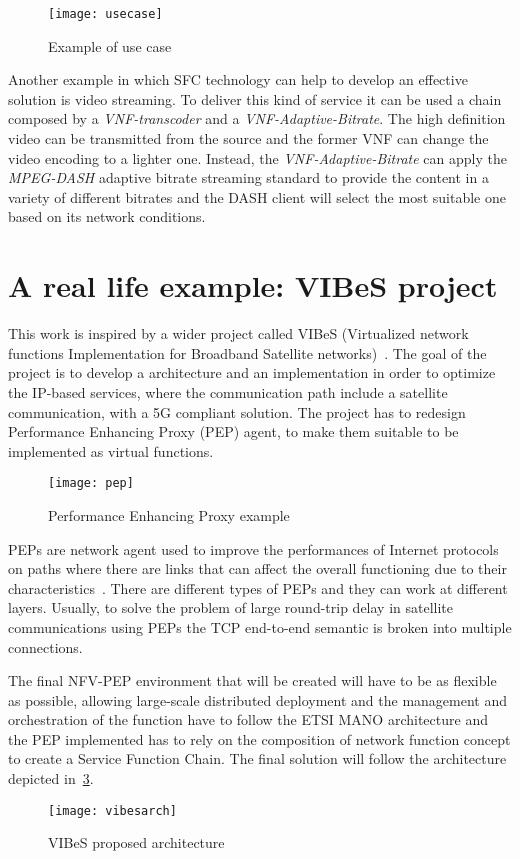 \begin{figure}[h]
  \centering
  \texttt{[image: usecase]}
  \caption{Example of use case}
  \label{chap:background:img:usec}
\end{figure}

Another example in which SFC technology can help to develop an effective
solution is video streaming. To deliver this kind of service it can be used a
chain composed by a \emph{VNF-transcoder} and a \emph{VNF-Adaptive-Bitrate}. The
high definition video can be transmitted from the source and the former VNF
can change the video encoding to a lighter one. Instead, the
\emph{VNF-Adaptive-Bitrate} can apply the \emph{MPEG-DASH} adaptive bitrate
streaming standard to provide the content in a variety of different bitrates and
the DASH client will select the most suitable one based on its network
conditions.

\section{A real life example: VIBeS project}
This work is inspired by a wider project called VIBeS (Virtualized network
functions Implementation for Broadband Satellite networks)~\cite{vibesesa}. The
goal of the project is to develop a architecture and an implementation in order
to optimize the IP-based services, where the communication path include a
satellite communication, with a 5G compliant solution. The project has to
redesign Performance Enhancing Proxy (PEP) agent, to make them suitable to be
implemented as virtual functions. 

\begin{figure}[ht]
  \centering
  \texttt{[image: pep]}
  \caption[Performance Enhancing Proxy example]{Performance Enhancing Proxy
  example}
  \label{chap:background:img:pep}
\end{figure}

PEPs are network agent used to improve the performances of Internet protocols on
paths where there are links that can affect the overall functioning due to their
characteristics~\cite{border2001rfc3135}. There are different types of PEPs and
they can work at different layers. Usually, to solve the problem of large
round-trip delay in satellite communications using PEPs the TCP end-to-end
semantic is broken into multiple connections.

The final NFV-PEP environment that will be created will have to be as flexible
as possible, allowing large-scale distributed deployment and the
management and orchestration of the function have to follow the ETSI MANO
architecture and the PEP implemented has to rely on the composition of
network function concept to create a Service Function Chain. The final solution
will follow the architecture depicted in~\ref{chap:background:img:vibesarch}.

\begin{figure}[h]
  \centering
  \texttt{[image: vibesarch]}
  \caption[VIBeS proposed architecture]{VIBeS proposed
  architecture~\cite{vibesesa}}
  \label{chap:background:img:vibesarch}
\end{figure}